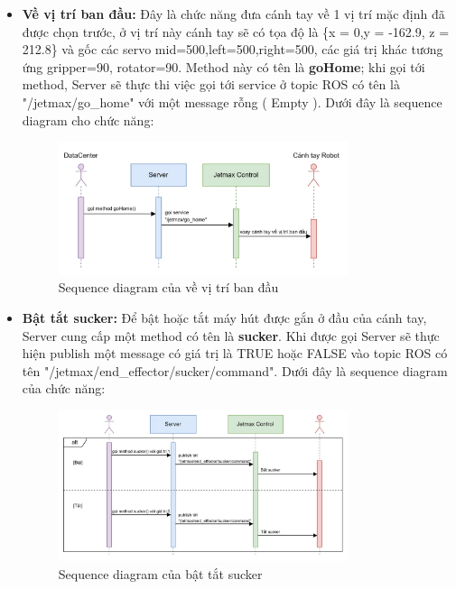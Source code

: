 \begin{itemize}
    \item \textbf{Về vị trí ban đầu:} Đây là chức năng đưa cánh tay về 1 vị trí mặc định đã được chọn trước, ở vị trí này cánh tay sẽ có tọa độ là \{x = 0,y = -162.9, z = 212.8\} và gốc các servo mid=500,left=500,right=500, các giá trị khác tương ứng gripper=90, rotator=90. Method này có tên là \textbf{goHome}; khi gọi tới method, Server sẽ thực thi việc gọi tới service ở topic ROS có tên là "/jetmax/go\_home" với một message rỗng ( Empty ). Dưới đây là sequence diagram cho chức năng:
    \begin{figure}[!h]
        \centering
        \includegraphics[width=0.8\textwidth]{Images/Implementation/Control/goHome.jpg}
        \caption{Sequence diagram của về vị trí ban đầu}
    \end{figure}
    
    \item \textbf{Bật tắt sucker:} Để bật hoặc tắt máy hút được gắn ở đầu của cánh tay, Server cung cấp một method có tên là \textbf{sucker}. Khi được gọi Server sẽ thực hiện publish một message có giá trị là TRUE hoặc FALSE vào topic ROS có tên "/jetmax/end\_effector/sucker/command". Dưới đây là sequence diagram của chức năng:
    \begin{figure}[!h]
        \centering
        \includegraphics[width=0.8\textwidth]{Images/Implementation/Control/sucker.jpg}
        \caption{Sequence diagram của bật tắt sucker}
    \end{figure}
    

\end{itemize}
